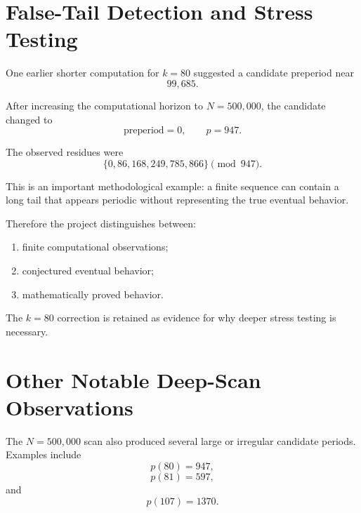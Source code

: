 \documentclass[11pt]{article}
\begin{document}
\section{False-Tail Detection and Stress Testing}

One earlier shorter computation for $k=80$ suggested a candidate preperiod near
\begin{equation}
    99{,}685.
\end{equation}

After increasing the computational horizon to $N=500{,}000$, the candidate changed to
\begin{equation}
\boxed{
    \text{preperiod}=0,
    \qquad
    p=947.
}
\end{equation}

The observed residues were
\begin{equation}
    \{0,86,168,249,785,866\}\pmod{947}.
\end{equation}

This is an important methodological example: a finite sequence can contain a long tail that appears periodic without representing the true eventual behavior.

Therefore the project distinguishes between:
\begin{enumerate}
    \item finite computational observations;
    \item conjectured eventual behavior;
    \item mathematically proved behavior.
\end{enumerate}

The $k=80$ correction is retained as evidence for why deeper stress testing is necessary.

\section{Other Notable Deep-Scan Observations}

The $N=500{,}000$ scan also produced several large or irregular candidate periods. Examples include
\begin{equation}
    p(80)=947,
\end{equation}
\begin{equation}
    p(81)=597,
\end{equation}
and
\begin{equation}
    p(107)=1370.
\end{equation}
\end{document}

